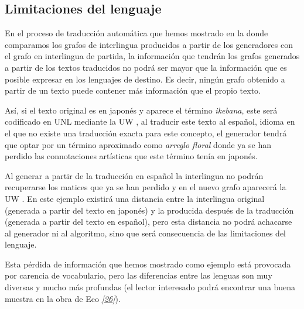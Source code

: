 \documentclass[a4paper,12pt,spanish]{book}
\begin{document}
\subsection{Limitaciones del lenguaje}
\label{1.state-of-the-art/iii.distancia-semantica:limitaciones-del-lenguaje}
En el proceso de traducción automática que hemos mostrado en la
{\hyperref[0.intro:fig-problema-interlingua]{\emph{}}} donde comparamos los grafos de interlingua producidos
a partir de los generadores con el grafo en interlingua de partida, la información que
tendrán los grafos generados a partir de los textos traducidos no podrá ser mayor que la
información que es posible expresar en los lenguajes de destino. Es decir, ningún grafo
obtenido a partir de un texto puede contener más información que el propio texto.

Así, si el texto original es en japonés y aparece el término \emph{ikebana}, este será codificado
en UNL mediante la UW , al traducir este texto al español,
idioma en el que no existe una traducción exacta para este concepto, el generador tendrá que optar
por un término aproximado como \emph{arreglo floral} donde ya se han perdido las connotaciones
artísticas que este término tenía en japonés.

Al generar a partir de la traducción en español la interlingua no podrán recuperarse
los matices que ya se han perdido y en el nuevo
grafo aparecerá la UW . En este ejemplo existirá una distancia entre la
interlingua original (generada a partir del texto en japonés) y la producida después de la
traducción (generada a partir del texto en español), pero esta distancia no podrá
achacarse al generador ni al algoritmo, sino que será consecuencia de las limitaciones
del lenguaje.

Esta pérdida de información que hemos mostrado como ejemplo está provocada por carencia de
vocabulario, pero las diferencias entre las lenguas son muy diversas y mucho
más profundas (el lector interesado podrá encontrar una buena muestra en la obra de
Eco \label{1.state-of-the-art/iii.distancia-semantica:id9}{\hyperref[zreferences:eco1999]{\emph{{[}26{]}}}}).
\end{document}
